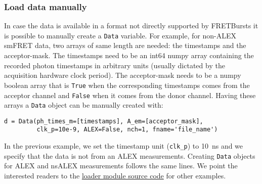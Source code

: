 \subsubsection{Load data manually}

In case the data is available in a format not directly supported by 
FRETBursts it is possible to manually create a \verb|Data| variable. 
For example, for non-ALEX smFRET data, two arrays of same length are 
needed: the timestamps and the acceptor-mask. The timestamps need to be 
an int64 numpy array containing the recorded photon timestamps in arbitrary 
units (usually dictated by the acquisition hardware clock period). 
The acceptor-mask needs to be a numpy boolean array that is \verb|True| 
when the corresponding timestamps comes from the acceptor channel and 
\verb|False| when it comes from the donor channel. Having these arrays a 
\verb|Data| object can be manually created with:

\begin{verbatim}
d = Data(ph_times_m=[timestamps], A_em=[acceptor_mask], 
         clk_p=10e-9, ALEX=False, nch=1, fname='file_name')
\end{verbatim}

In the previous example, we set the timestamp unit (\verb|clk_p|) to 10~ns 
and we specify that the data is not from an ALEX measurements. Creating 
\verb|Data| objects for ALEX and nsALEX measurements follows the same lines. 
We point the interested readers to the 
\href{https://github.com/tritemio/FRETBursts/blob/master/fretbursts/loader.py}{loader module source code} 
for other examples. 
